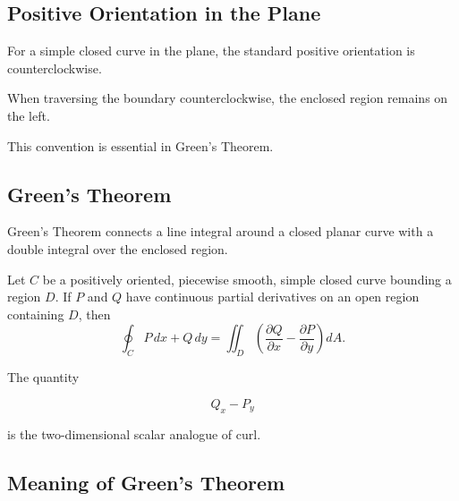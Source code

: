 \subsection{Positive Orientation in the Plane}
\label{subsec:positive-orientation-plane}

For a simple closed curve in the plane, the standard positive orientation
is counterclockwise.

When traversing the boundary counterclockwise, the enclosed region remains
on the left.

\begin{center}
\end{center}

This convention is essential in Green's Theorem.

\subsection{Green's Theorem}
\label{subsec:greens-theorem}

Green's Theorem connects a line integral around a closed planar curve with
a double integral over the enclosed region.

\begin{theorem}
Let \(C\) be a positively oriented, piecewise smooth, simple closed curve
bounding a region \(D\). If \(P\) and \(Q\) have continuous partial
derivatives on an open region containing \(D\), then
\[ \boxed{
\oint_C P\,dx+Q\,dy
=
\iint_D
\left(
\frac{\partial Q}{\partial x}
-
\frac{\partial P}{\partial y}
\right)dA.
} \]
\end{theorem}

The quantity

\[ Q_x-P_y \]

is the two-dimensional scalar analogue of curl.

\subsection{Meaning of Green's Theorem}
\label{subsec:meaning-greens-theorem}

